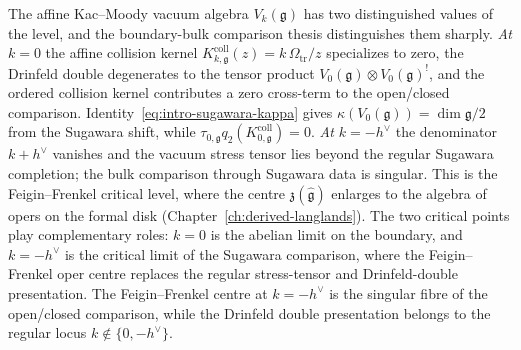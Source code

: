 \begin{remark}[Two critical points: $k = 0$ and $k = -h^\vee$]
\label{rem:two-critical-points}
%
%
%
The affine Kac--Moody vacuum algebra $V_k(\mathfrak{g})$ has two
distinguished values of the level, and the boundary-bulk
comparison thesis distinguishes them sharply.
\emph{At $k = 0$} the affine collision kernel
$K_{k,\mathfrak g}^{\mathrm{coll}}(z)=k\,\Omega_{\mathrm{tr}}/z$
specializes to zero, the Drinfeld double degenerates to the tensor
product $V_0(\mathfrak{g}) \otimes V_0(\mathfrak{g})^!$, and the
ordered collision kernel contributes a zero cross-term to the
open/closed comparison.
Identity~\eqref{eq:intro-sugawara-kappa} gives
$\kappa(V_0(\mathfrak{g})) = \dim\mathfrak{g}/2$ from the Sugawara
shift, while
$\tau_{0,\mathfrak g}q_2(K_{0,\mathfrak g}^{\mathrm{coll}})=0$.
\emph{At $k = -h^\vee$} the denominator $k + h^\vee$ vanishes and the
vacuum stress tensor lies beyond the regular Sugawara completion; the
bulk comparison through Sugawara data is singular. This is the
Feigin--Frenkel critical level, where the centre
$\mathfrak{z}(\widehat{\mathfrak{g}})$
enlarges to the algebra of opers on the formal disk
(Chapter~\ref{ch:derived-langlands}).
The two critical points play complementary roles: $k = 0$ is the
abelian limit on the boundary, and $k = -h^\vee$ is the critical
limit of the Sugawara comparison, where the Feigin--Frenkel oper
centre replaces the regular stress-tensor and Drinfeld-double
presentation.
The Feigin--Frenkel centre at $k = -h^\vee$ is the singular fibre
of the open/closed comparison, while the Drinfeld double presentation
belongs to the regular locus $k \notin \{0, -h^\vee\}$.
\end{remark}

\medskip

